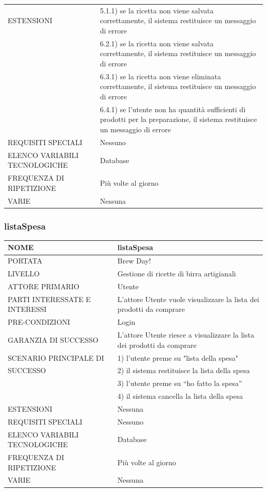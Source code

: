 \documentclass[a4paper, titlepage]{article}
\begin{document}
\begin{longtable}{p{6cm}p{7cm}}
    ESTENSIONI
    & 5.1.1) se la ricetta non viene salvata correttamente, il sistema restituisce un messaggio di errore\\
    & 6.2.1) se la ricetta non viene salvata correttamente, il sistema restituisce un messaggio di errore\\
    & 6.3.1) se la ricetta non viene eliminata correttamente, il sistema restituisce un messaggio di errore \\
    & 6.4.1) se l'utente non ha quantità sufficienti di prodotti per la preparazione, il sistema restituisce un messaggio di errore\\\midrule
    REQUISITI SPECIALI & Nessuno\\\midrule
    ELENCO VARIABILI TECNOLOGICHE & Database\\\midrule
    FREQUENZA DI RIPETIZIONE & Più volte al giorno\\\midrule
    VARIE & Nessuna\\\bottomrule
\end{longtable}
\vphantom{}
\subsubsection{listaSpesa}
\begin{longtable}{p{6cm}p{7cm}}\toprule
    NOME & listaSpesa\\\midrule
    PORTATA & Brew Day!\\\midrule
    LIVELLO & Gestione di ricette di birra artigianali\\\midrule
    ATTORE PRIMARIO & Utente\\\midrule
    PARTI INTERESSATE E INTERESSI & L’attore Utente vuole visualizzare la lista dei prodotti da comprare\\\midrule
    PRE-CONDIZIONI & Login\\\midrule
    GARANZIA DI SUCCESSO & L’attore Utente riesce a  visualizzare la lista dei prodotti da comprare\\\midrule
    SCENARIO PRINCIPALE DI
    & 1) l'utente preme su "lista della spesa"\\
    SUCCESSO & 2) il sistema restituisce la lista della spesa\\
    & 3) l’utente preme su “ho fatto la spesa”\\
    & 4) il sistema cancella la lista della spesa\\\midrule
    ESTENSIONI & Nessuna\\\midrule
    REQUISITI SPECIALI & Nessuno\\\midrule
    ELENCO VARIABILI TECNOLOGICHE & Database\\\midrule
    FREQUENZA DI RIPETIZIONE & Più volte al giorno\\\midrule
    VARIE & Nessuna\\\bottomrule
\end{longtable}
\vphantom{}
\newpage
\end{document}
